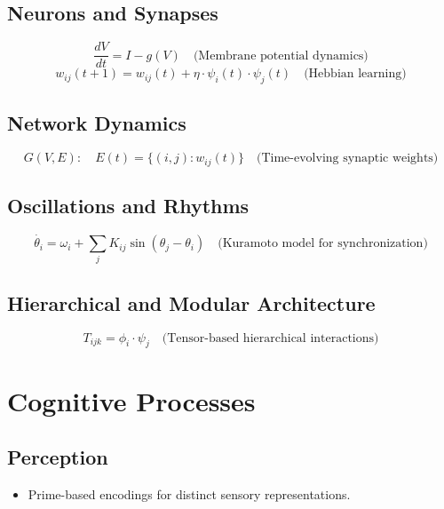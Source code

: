 \documentclass{article}
\theoremstyle{plain}
\begin{document}
\subsection{Neurons and Synapses}
\begin{equation}
    \frac{dV}{dt} = I - g(V) \quad \text{(Membrane potential dynamics)}
\end{equation}
\begin{equation}
    w_{ij}(t+1) = w_{ij}(t) + \eta \cdot \psi_i(t) \cdot \psi_j(t) \quad \text{(Hebbian learning)}
\end{equation}

\subsection{Network Dynamics}
\begin{equation}
    G(V, E): \quad E(t) = \{(i, j): w_{ij}(t)\} \quad \text{(Time-evolving synaptic weights)}
\end{equation}

\subsection{Oscillations and Rhythms}
\begin{equation}
    \dot{\theta_i} = \omega_i + \sum_{j} K_{ij} \sin(\theta_j - \theta_i) \quad \text{(Kuramoto model for synchronization)}
\end{equation}

\subsection{Hierarchical and Modular Architecture}
\begin{equation}
    T_{ijk} = \phi_{i} \cdot \psi_j \quad \text{(Tensor-based hierarchical interactions)}
\end{equation}

\section{Cognitive Processes}

\subsection{Perception}
\begin{itemize}
    \item Prime-based encodings for distinct sensory representations.
\end{itemize}
\end{document}

